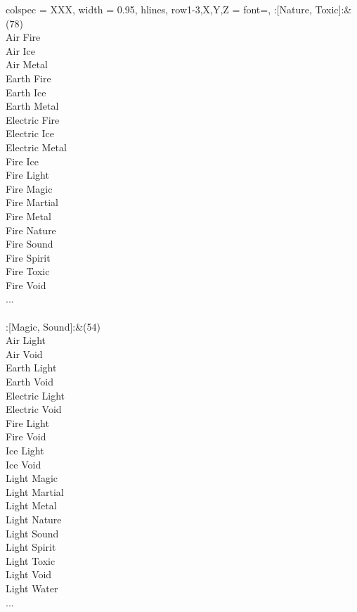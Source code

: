 \begin{longtblr}[
	caption = {2v2 Defending Weak},
	label = {2v2-Defending-Weak},
]{
	colspec = {XXX}, width = 0.95\linewidth,
	hlines,
	row{1-3,X,Y,Z} = {font=\bfseries},
}
	:[Nature, Toxic]:&{(78)\\
	Air Fire \\
	Air Ice \\
	Air Metal \\
	Earth Fire \\
	Earth Ice \\
	Earth Metal \\
	Electric Fire \\
	Electric Ice \\
	Electric Metal \\
	Fire Ice \\
	Fire Light \\
	Fire Magic \\
	Fire Martial \\
	Fire Metal \\
	Fire Nature \\
	Fire Sound \\
	Fire Spirit \\
	Fire Toxic \\
	Fire Void \\
	...\\
	}\\

	:[Magic, Sound]:&{(54)\\
	Air Light \\
	Air Void \\
	Earth Light \\
	Earth Void \\
	Electric Light \\
	Electric Void \\
	Fire Light \\
	Fire Void \\
	Ice Light \\
	Ice Void \\
	Light Magic \\
	Light Martial \\
	Light Metal \\
	Light Nature \\
	Light Sound \\
	Light Spirit \\
	Light Toxic \\
	Light Void \\
	Light Water \\
	...\\
	}\\


\end{longtblr}
